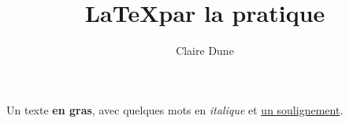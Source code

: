 \documentclass[10pt,a4paper]{article}
\author{Claire Dune}
\title{\LaTeX par la pratique}
\begin{document}
 Un texte \textbf{en gras}, avec quelques mots en \textit{italique} et \underline{un soulignement}.
\end{document}
